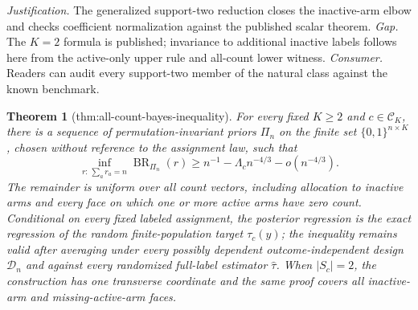 \documentclass{article}
\newtheorem{theorem}{Theorem}
\begin{document}
\par\smallskip\noindent \textit{Justification.} The generalized support-two reduction closes the inactive-arm elbow and checks coefficient normalization against the published scalar theorem. \textit{Gap.} The \(K=2\) formula is published; invariance to additional inactive labels follows here from the active-only upper rule and all-count lower witness. \textit{Consumer.} Readers can audit every support-two member of the natural class against the known benchmark.

\begin{theorem}[thm:all-count-bayes-inequality]\label{thm:all-count-bayes-inequality}
For every fixed \(K\ge2\) and \(c\in\mathcal C_K\), there is a sequence of permutation-invariant priors \(\Pi_n\) on the finite set \(\{0,1\}^{n\times K}\), chosen without reference to the assignment law, such that
\[
\inf_{r:\,\sum_ar_a=n}\operatorname{BR}_{\Pi_n}(r)
\ge n^{-1}-\Lambda_cn^{-4/3}-o(n^{-4/3}).
\]
The remainder is uniform over all count vectors, including allocation to inactive arms and every face on which one or more active arms have zero count.  Conditional on every fixed labeled assignment, the posterior regression is the exact regression of the random finite-population target \(\tau_c(y)\); the inequality remains valid after averaging under every possibly dependent outcome-independent design \(\mathcal D_n\) and against every randomized full-label estimator \(\widehat\tau\).  When \(|S_c|=2\), the construction has one transverse coordinate and the same proof covers all inactive-arm and missing-active-arm faces.
\end{theorem}
\end{document}
